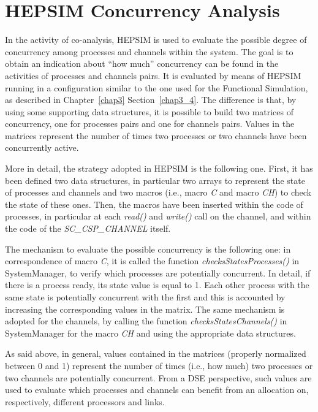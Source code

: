 \section{HEPSIM Concurrency Analysis}\label{concurrency_explain}
%
In the activity of co-analysis, HEPSIM is used to evaluate the possible degree of concurrency among processes and channels within the system. The goal is to obtain an indication about “how much” concurrency can be found in the activities of processes and channels pairs. It is evaluated by means of HEPSIM running in a configuration similar to the one used for the Functional Simulation, as described in Chapter~\ref{chap3} Section~\ref{chap3_4}. The difference is that, by using some supporting data structures, it is possible to build two matrices of concurrency, one for processes pairs and one for channels pairs. Values in the matrices represent the number of times two processes or two channels have been concurrently active. \par
More in detail, the strategy adopted in HEPSIM is the following one. First, it has been defined two data structures, in particular two arrays to represent the state of processes and channels and two macros (i.e., macro \textit{C} and macro \textit{CH}) to check the state of these ones. %
Then, the macros have been inserted within the code of processes, in particular at each \textit{read()} and \textit{write()} call on the channel, and within the code of the \textit{SC\_CSP\_CHANNEL} itself. \par
The mechanism to evaluate the possible concurrency is the following one: in correspondence of macro \textit{C}, it is called the function \textit{checksStatesProcesses()} in SystemManager, to verify which processes are potentially concurrent. In detail, if there is a process ready, its state value is equal to 1. Each other process with the same state is potentially concurrent with the first and this is accounted by increasing the corresponding values in the matrix. The same mechanism is adopted for the channels, by calling the function \textit{checksStatesChannels()} in SystemManager for the macro \textit{CH} and using the appropriate data structures. \par
As said above, in general, values contained in the matrices (properly normalized between 0 and 1) represent the number of times (i.e., how much) two processes or two channels are potentially concurrent. From a DSE perspective, such values are used to evaluate which processes and channels can benefit from an allocation on, respectively, different processors and links.
